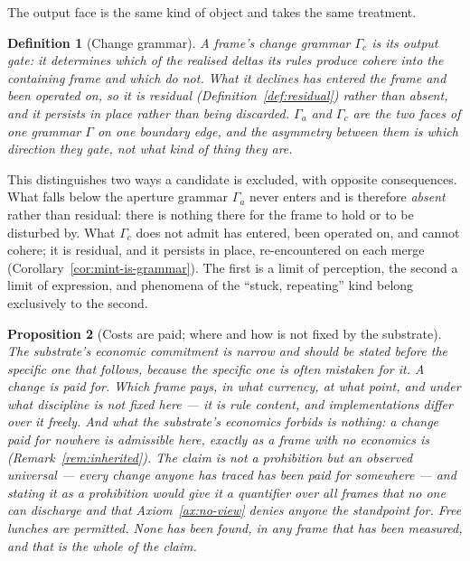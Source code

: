 \documentclass[11pt,a4paper]{article}
\newtheorem{definition}{Definition}[section]
\newtheorem{proposition}[definition]{Proposition}
\theoremstyle{remark}\newtheorem{remark}[definition]{Remark}
\begin{document}
The output face is the same kind of object and takes the same treatment.

\begin{definition}[Change grammar]\label{def:change-grammar}
A frame's \emph{change grammar} $\Gamma_c$ is its output gate: it determines which of the realised
deltas its rules produce cohere into the containing frame and which do not. What it declines has
entered the frame and been operated on, so it is \emph{residual} (Definition~\ref{def:residual})
rather than absent, and it persists in place rather than being discarded. $\Gamma_a$ and $\Gamma_c$
are the two faces of one grammar $\Gamma$ on one boundary edge, and the asymmetry between them is
which direction they gate, not what kind of thing they are.
\end{definition}

This distinguishes two ways a candidate is excluded, with opposite consequences. What falls below the aperture grammar $\Gamma_a$ never enters and is therefore \emph{absent} rather than residual: there is nothing there for the frame to hold or to be disturbed by. What $\Gamma_c$ does not admit has entered, been operated on, and cannot cohere; it is residual, and it persists in place, re-encountered on each merge (Corollary~\ref{cor:mint-is-grammar}). The first is a limit of perception, the second a limit of expression, and phenomena of the ``stuck, repeating'' kind belong exclusively to the second.

\begin{proposition}[Costs are paid; where and how is not fixed by the substrate]\label{prop:no-free-lunch}
The substrate's economic commitment is narrow and should be stated before the specific one that
follows, because the specific one is often mistaken for it. \emph{A change is paid for.} Which frame
pays, in what currency, at what point, and under what discipline is \emph{not} fixed here --- it is
rule content, and implementations differ over it freely. And what the substrate's \emph{economics} forbids is nothing: a change paid
for nowhere is admissible here, exactly as a frame with no economics is
(Remark~\ref{rem:inherited}). The claim is not a prohibition but an observed universal --- \emph{every
change anyone has traced has been paid for somewhere} --- and stating it as a prohibition would give
it a quantifier over all frames that no one can discharge and that
Axiom~\ref{ax:no-view} denies anyone the standpoint for. Free lunches are permitted. None has been
found, in any frame that has been measured, and that is the whole of the claim.
\end{proposition}
\end{document}
